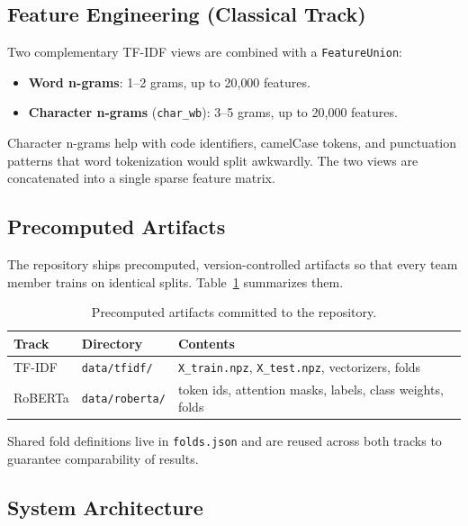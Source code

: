 \documentclass[11pt,a4paper]{article}
\begin{document}
\subsection{Feature Engineering (Classical Track)}

Two complementary TF-IDF views are combined with a \texttt{FeatureUnion}:

\begin{itemize}[nosep]
    \item \textbf{Word n-grams}: 1--2 grams, up to 20{,}000 features.
    \item \textbf{Character n-grams} (\texttt{char\_wb}): 3--5 grams, up to
          20{,}000 features.
\end{itemize}

Character n-grams help with code identifiers, camelCase tokens, and punctuation
patterns that word tokenization would split awkwardly. The two views are
concatenated into a single sparse feature matrix.

\subsection{Precomputed Artifacts}

The repository ships precomputed, version-controlled artifacts so that every team
member trains on identical splits. Table~\ref{tab:artifacts} summarizes them.

\begin{table}[H]
\centering
\caption{Precomputed artifacts committed to the repository.}
\label{tab:artifacts}
\begin{tabular}{lll}
\toprule
\textbf{Track} & \textbf{Directory} & \textbf{Contents} \\
\midrule
TF-IDF  & \texttt{data/tfidf/}   & \texttt{X\_train.npz}, \texttt{X\_test.npz}, vectorizers, folds \\
RoBERTa & \texttt{data/roberta/} & token ids, attention masks, labels, class weights, folds \\
\bottomrule
\end{tabular}
\end{table}

Shared fold definitions live in \texttt{folds.json} and are reused across both
tracks to guarantee comparability of results.

\subsection{System Architecture}
\end{document}
